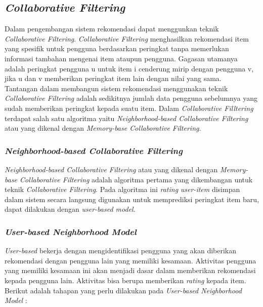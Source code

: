 \subsection{\textit{Collaborative Filtering}}
\label{sec:collaborative filtering}
	Dalam pengembangan sistem rekomendasi dapat menggunkan teknik \textit{Collaborative Filtering}. \textit{Collaborative Filtering} menghasilkan rekomendasi item yang spesifik untuk pengguna berdasarkan peringkat tanpa memerlukan informasi tambahan mengenai item ataupun pengguna. Gagasan utamanya adalah peringkat pengguna u untuk item i cenderung mirip dengan pengguna v, jika u dan v memberikan peringkat item lain dengan nilai yang sama. \\%
	Tantangan dalam membangun sistem rekomendasi menggunakan teknik \textit{Collaborative Filtering} adalah sedikitnya jumlah data pengguna sebelumnya yang sudah memberikan peringkat kepada suatu item. Dalam \textit{Collaborative Filltering} terdapat salah satu algoritma yaitu \textit{Neighborhood-based Collaborative Filtering} atau yang dikenal dengan \textit{Memory-base Collaborative Filtering}.
	
\subsubsection{\textit{Neighborhood-based Collaborative Filtering}}
\textit{Neighborhood-based Collaborative Filtering} atau yang dikenal dengan \textit{Memory-base Collaborative Filtering} adalah algoritma pertama yang dikembangan untuk teknik \textit{Collaborative Filtering}. Pada algoritma ini \textit{rating} \textit{user-item} disimpan dalam sistem secara langsung digunakan untuk memprediksi peringkat item baru, dapat dilakukan dengan \textit{user-based model}. %

\subsubsection{\textit{User-based Neighborhood Model}}
\label{user-based}
\textit{User-based} bekerja dengan mengidentifikasi pengguna yang akan diberikan rekomendasi dengan pengguna lain yang memiliki kesamaan. Aktivitas pengguna yang memiliki kesamaan ini akan menjadi dasar dalam memberikan rekomendasi kepada pengguna lain. Aktivitas bisa berupa memberikan \textit{rating} kepada item. Berikut adalah tahapan yang perlu dilakukan pada \textit{User-based Neighborhood Model} : 

